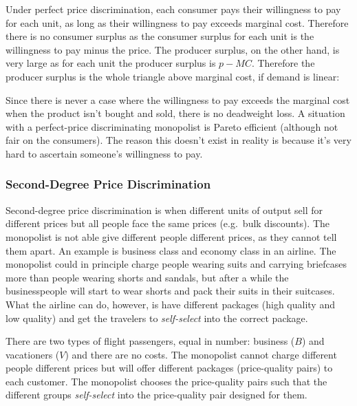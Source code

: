 \documentclass{article}
\begin{document}
Under perfect price discrimination, each consumer pays their willingness to pay for each unit, as long as their willingness to pay exceeds marginal cost. Therefore there is no consumer surplus as the consumer surplus for each unit is the willingness to pay minus the price. The producer surplus, on the other hand, is very large as for each unit the producer surplus is $p-MC$. Therefore the producer surplus is the whole triangle above marginal cost, if demand is linear:

\begin{center}
\end{center}

Since there is never a case where the willingness to pay exceeds the marginal cost when the product isn't bought and sold, there is no deadweight loss. A situation with a perfect-price discriminating monopolist is Pareto efficient (although not fair on the consumers). The reason this doesn't exist in reality is because it's very hard to ascertain someone's willingness to pay.


\subsubsection*{Second-Degree Price Discrimination}
Second-degree price discrimination is when different units of output
sell for different prices but all people face the same prices (e.g.~bulk
discounts). The monopolist is not able give different people different prices, as they cannot tell them apart. An example is business class and economy class in an airline. The monopolist could in principle charge people wearing suits and carrying briefcases more than people wearing shorts and sandals, but after a while the businesspeople will start to wear shorts and pack their suits in their suitcases. What the airline can do, however, is have different packages (high quality and low quality) and get the travelers to \emph{self-select} into the correct package.

\medskip
\par{}\par
There are two types of flight passengers, equal in number: business ($B$) and vacationers ($V$) and there are no costs. The monopolist cannot charge different people different prices but will offer different packages (price-quality pairs) to each customer. The monopolist chooses the price-quality pairs such that the different groups \emph{self-select} into the price-quality pair designed for them.
\end{document}
